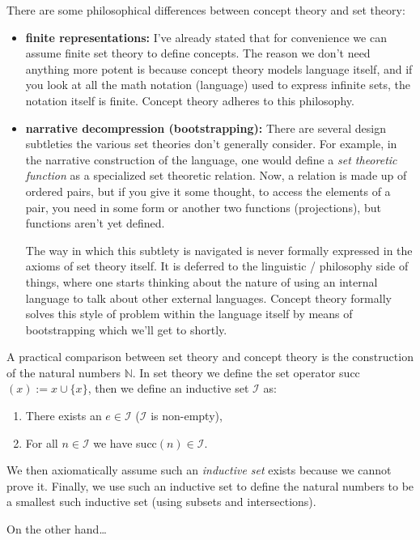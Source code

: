 \documentclass[twoside]{article}
\begin{document}
There are some philosophical differences between concept theory and set theory:
\begin{itemize}
\item {\bfseries finite representations:} I've already stated that for convenience we can assume finite set theory to define
concepts. The reason we don't need anything more potent is because concept theory models language itself, and if you look at
all the math notation (language) used to express infinite sets, the notation itself is finite. Concept theory adheres to
this philosophy.
\item {\bfseries narrative decompression (bootstrapping):} There are several design subtleties the various set theories
don't generally consider. For example, in the narrative construction of the language, one would define a
\emph{set theoretic function} as a specialized set theoretic relation. Now, a relation is made up of ordered pairs,
but if you give it some thought, to access the elements of a pair, you need in some form or another two functions
(projections), but functions aren't yet defined.

The way in which this subtlety is navigated is never formally expressed in the axioms of set theory itself. It is deferred
to the linguistic / philosophy side of things, where one starts thinking about the nature of using an internal language to
talk about other external languages. Concept theory formally solves this style of problem within the language itself
by means of bootstrapping which we'll get to shortly.
\end{itemize}

A practical comparison between set theory and concept theory is the construction of the natural numbers $ \mathbb{N} $.
In set theory we define the set operator succ$ (x) := x \cup \{x\} $, then we define an inductive set $ \mathcal{I} $ as:
\begin{enumerate}
\item There exists an $ e \in \mathcal{I} $ ($ \mathcal{I} $ is non-empty),
\item For all $ n \in \mathcal{I} $ we have succ$ (n) \in \mathcal{I} $.
\end{enumerate}
We then axiomatically assume such an \emph{inductive set} exists because we cannot prove it. Finally, we use such an
inductive set to define the natural numbers to be a smallest such inductive set (using subsets and intersections).

On the other hand\ldots
\end{document}
